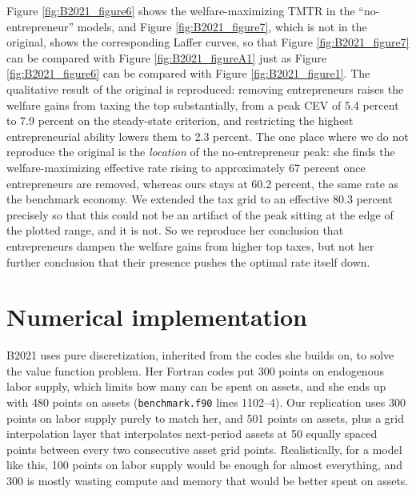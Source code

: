 \documentclass[11pt,fleqn]{article}
\begin{document}
Figure \ref{fig:B2021_figure6} shows the welfare-maximizing TMTR in the ``no-entrepreneur'' models, and Figure \ref{fig:B2021_figure7}, which is not in the original, shows the corresponding Laffer curves, so that Figure \ref{fig:B2021_figure7} can be compared with Figure \ref{fig:B2021_figureA1} just as Figure \ref{fig:B2021_figure6} can be compared with Figure \ref{fig:B2021_figure1}. The qualitative result of the original is reproduced: removing entrepreneurs raises the welfare gains from taxing the top substantially, from a peak CEV of 5.4 percent to 7.9 percent on the steady-state criterion, and restricting the highest entrepreneurial ability lowers them to 2.3 percent. The one place where we do not reproduce the original is the \textit{location} of the no-entrepreneur peak: she finds the welfare-maximizing effective rate rising to approximately 67 percent once entrepreneurs are removed, whereas ours stays at 60.2 percent, the same rate as the benchmark economy. We extended the tax grid to an effective 80.3 percent precisely so that this could not be an artifact of the peak sitting at the edge of the plotted range, and it is not. So we reproduce her conclusion that entrepreneurs dampen the welfare gains from higher top taxes, but not her further conclusion that their presence pushes the optimal rate itself down.

\section{Numerical implementation}
B2021 uses pure discretization, inherited from the \citet{CagettiDeNardi2009} codes she builds on, to solve the value function problem. Her Fortran codes put 300 points on endogenous labor supply, which limits how many can be spent on assets, and she ends up with 480 points on assets (\texttt{benchmark.f90} lines 1102--4). Our replication uses 300 points on labor supply purely to match her, and 501 points on assets, plus a grid interpolation layer that interpolates next-period assets at 50 equally spaced points between every two consecutive asset grid points. Realistically, for a model like this, 100 points on labor supply would be enough for almost everything, and 300 is mostly wasting compute and memory that would be better spent on assets.
\end{document}
